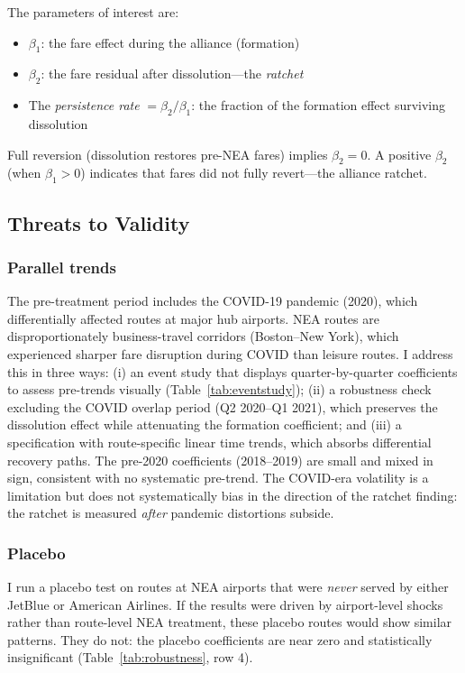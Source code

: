 \documentclass[12pt]{article}
\begin{document}
The parameters of interest are:
\begin{itemize}
\item $\beta_1$: the fare effect during the alliance (formation)
\item $\beta_2$: the fare residual after dissolution---the \textit{ratchet}
\item The \textit{persistence rate} $= \beta_2 / \beta_1$: the fraction of the formation effect surviving dissolution
\end{itemize}

Full reversion (dissolution restores pre-NEA fares) implies $\beta_2 = 0$. A positive $\beta_2$ (when $\beta_1 > 0$) indicates that fares did not fully revert---the alliance ratchet.

\subsection{Threats to Validity}

\subsubsection*{Parallel trends} The pre-treatment period includes the COVID-19 pandemic (2020), which differentially affected routes at major hub airports. NEA routes are disproportionately business-travel corridors (Boston--New York), which experienced sharper fare disruption during COVID than leisure routes. I address this in three ways: (i) an event study that displays quarter-by-quarter coefficients to assess pre-trends visually (Table~\ref{tab:eventstudy}); (ii) a robustness check excluding the COVID overlap period (Q2 2020--Q1 2021), which preserves the dissolution effect while attenuating the formation coefficient; and (iii) a specification with route-specific linear time trends, which absorbs differential recovery paths. The pre-2020 coefficients (2018--2019) are small and mixed in sign, consistent with no systematic pre-trend. The COVID-era volatility is a limitation but does not systematically bias in the direction of the ratchet finding: the ratchet is measured \textit{after} pandemic distortions subside.

\subsubsection*{Placebo} I run a placebo test on routes at NEA airports that were \textit{never} served by either JetBlue or American Airlines. If the results were driven by airport-level shocks rather than route-level NEA treatment, these placebo routes would show similar patterns. They do not: the placebo coefficients are near zero and statistically insignificant (Table~\ref{tab:robustness}, row 4).
\end{document}

